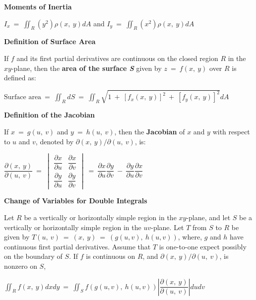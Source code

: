 \documentclass{article}
\begin{document}
\begin{large}
\textbf{Moments of Inertia}

\hspace{1.0in} $I_{x}\ =\ \displaystyle\iint_{R}(y^{2})\rho(x,\ y)dA$ and $I_{y}\ =\ \displaystyle\iint_{R}(x^{2})\rho(x,\ y)dA$

\textbf{Definition of Surface Area}

\hspace{0.1in} If $f$ and its first partial derivatives are continuous on the closed region $R$ in the $xy$-plane, then the \textbf{area of the surface \textit{S}} given by $z\ =\ f(x,\ y)$ over $R$ is defined as:

\hspace{0.5in} $\text{Surface area}\ =\ \displaystyle\iint_{R}dS\ =\ \displaystyle\iint_{R}\sqrt{1\ +\ [f_{x}(x,\ y)]^{2}\ +\ [f_{y}(x,\ y)]^{2}}dA$

\vspace{1.2in}
\textbf{Definition of the Jacobian}

\hspace{0.1in} If $x\ =\ g(u,\ v)$ and $y\ =\ h(u,\ v)$, then the \textbf{Jacobian} of $x$ and $y$ with respect to $u$ and $v$, denoted by $\partial(x,\ y)/\partial(u,\ v)$, is:

\hspace{2.0in} $\dfrac{\partial(x,\ y)}{\partial(u,\ v)}\ =\ \begin{vmatrix} \dfrac{\partial x}{\partial u} & \dfrac{\partial x}{\partial v} \\ \dfrac{\partial y}{\partial u} & \dfrac{\partial y}{\partial v} \end{vmatrix}\ =\ \dfrac{\partial x}{\partial u}\dfrac{\partial y}{\partial v}\ -\ \dfrac{\partial y}{\partial u}\dfrac{\partial x}{\partial v}$

\vspace{0.1in}
\textbf{Change of Variables for Double Integrals}

\vspace{-0.2in}
\hspace{0.1in} Let $R$ be a vertically or horizontally simple region in the $xy$-plane, and let $S$ be a vertically or horizontally simple region in the $uv$-plane. Let $T$ from $S$ to $R$ be given by $T(u,\ v)\ =\ (x,\ y)\ =\ (g(u,v),\ h(u,v))$, where, $g$ and $h$ have continuous first partial derivatives. Assume that $T$ is one-to-one expect possibly on the boundary of $S$. If $f$ is continuous on $R$, and $\partial(x,\ y)/\partial(u,\ v)$, is nonzero on $S$,

\hspace{1.0in} $\displaystyle\iint_{R}f(x,\ y)dxdy\ =\ \displaystyle\iint_{S}f(g(u,v),\ h(u,v))\left|\dfrac{\partial(x,\ y)}{\partial(u,\ v)}\right|dudv$


\end{large}
\end{document}
